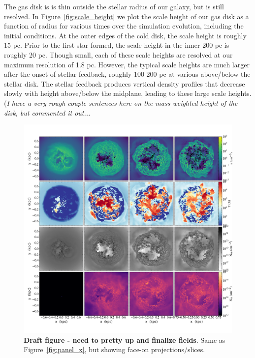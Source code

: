 \documentclass[twocolumn]{aastex61}
\begin{document}
The gas disk is is thin outside the stellar radius of our galaxy, but is still resolved. In Figure~\ref{fig:scale_height} we plot the scale height of our gas disk as a function of radius for various times over the simulation evolution, including the initial conditions. At the outer edges of the cold disk, the scale height is roughly 15 pc. Prior to the first star formed, the scale height in the inner 200 pc is roughly 20 pc. Though small, each of these scale heights are resolved at our maximum resolution of 1.8 pc. However, the typical scale heights are much larger after the onset of stellar feedback, roughly 100-200 pc at various above/below the stellar disk. The stellar feedback produces vertical density profiles that decrease slowly with height above/below the midplane, leading to these large scale heights. (\textit{I have a very rough couple sentences here on the mass-weighted height of the disk, but commented it out...}

\begin{figure}
\centering
\includegraphics[width=0.975\linewidth]{multiplot_4x4_z.png}
\caption{\textbf{Draft figure - need to pretty up and finalize fields}. Same as Figure~\ref{fig:panel_x}, but showing face-on projections/slices.}
\label{fig:panel_z}
\end{figure}
\end{document}
